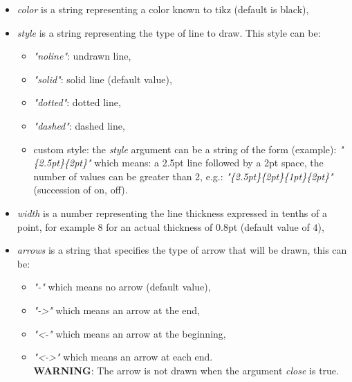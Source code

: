 \begin{itemize}
    \item \emph{color} is a string representing a color known to tikz (default is black),
    \item \emph{style} is a string representing the type of line to draw. This style can be:
\begin{itemize}
    \item \emph{"noline"}: undrawn line,
    \item \emph{"solid"}: solid line (default value),
    \item \emph{"dotted"}: dotted line,
    \item \emph{"dashed"}: dashed line,
    \item custom style: the \emph{style} argument can be a string of the form (example): \emph{"\{2.5pt\}\{2pt\}"} which means: a 2.5pt line followed by a 2pt space, the number of values ​​can be greater than 2, e.g.: \emph{"\{2.5pt\}\{2pt\}\{1pt\}\{2pt\}"} (succession of on, off).
\end{itemize}
    \item \emph{width} is a number representing the line thickness expressed in tenths of a point, for example $8$ for an actual thickness of 0.8pt (default value of $4$),
    \item \emph{arrows} is a string that specifies the type of arrow that will be drawn, this can be:
\begin{itemize}
    \item \emph{"-"} which means no arrow (default value),
    \item \emph{"->"} which means an arrow at the end,
    \item \emph{"<-"} which means an arrow at the beginning,
    \item \emph{"<->"} which means an arrow at each end.\\
\textbf{WARNING}: The arrow is not drawn when the argument \emph{close} is true. \end{itemize}
\end{itemize}

